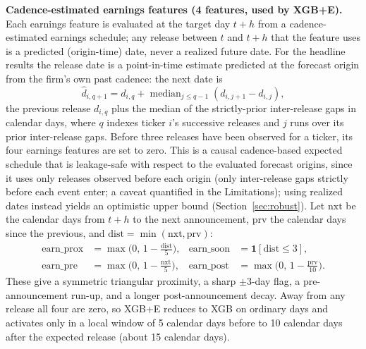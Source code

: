 \documentclass[runningheads,a4paper]{llncs}
\begin{document}
\textbf{Cadence-estimated earnings features (4 features, used by XGB+E).} Each earnings feature is evaluated
at the target day $t+h$ from a cadence-estimated earnings schedule; any release between $t$ and $t+h$ that
the feature uses is a predicted (origin-time) date, never a realized future date. For the headline results
the release date is a point-in-time estimate predicted at the forecast origin from the firm's own past
cadence: the next date is
\[ \hat d_{i,q+1} = d_{i,q} + \operatorname{median}_{j\le q-1}\left(d_{i,j+1}-d_{i,j}\right), \]
the previous release $d_{i,q}$ plus the median of the strictly-prior inter-release gaps in calendar days,
where $q$ indexes ticker $i$'s successive releases and $j$ runs over its prior inter-release gaps.
Before three releases have been observed for a ticker, its four earnings features are set to zero. This is a
causal cadence-based expected schedule that is leakage-safe with respect to the evaluated forecast origins,
since it uses only releases observed before each origin (only inter-release gaps strictly before each event
enter; a caveat quantified in the Limitations); using realized dates instead yields an optimistic upper bound
(Section~\ref{sec:robust}). Let $\mathrm{nxt}$ be the calendar days from $t+h$ to
the next announcement, $\mathrm{prv}$ the calendar days since the previous, and
$\mathrm{dist}=\min(\mathrm{nxt},\mathrm{prv})$:
\begin{align}
\mathrm{earn\_prox} &= \max\!\Big(0,\,1-\tfrac{\mathrm{dist}}{5}\Big), &
\mathrm{earn\_soon} &= \mathbf{1}[\mathrm{dist}\le 3],\\
\mathrm{earn\_pre} &= \max\!\Big(0,\,1-\tfrac{\mathrm{nxt}}{5}\Big), &
\mathrm{earn\_post} &= \max\!\Big(0,\,1-\tfrac{\mathrm{prv}}{10}\Big).
\end{align}
These give a symmetric triangular proximity, a sharp $\pm 3$-day flag, a pre-announcement run-up, and a
longer post-announcement decay. Away from any release all four are zero, so XGB+E reduces to XGB on ordinary
days and activates only in a local window of 5 calendar days before to 10 calendar days after the expected
release (about 15 calendar days).
\end{document}
